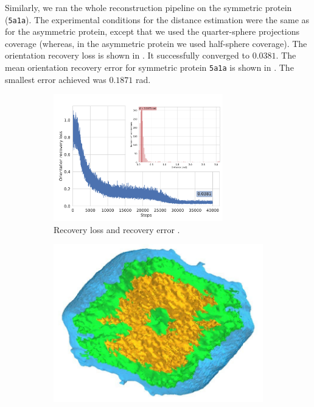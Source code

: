 Similarly, we ran the whole reconstruction pipeline on the symmetric protein (\texttt{5a1a}).
The experimental conditions for the distance estimation were the same as for the asymmetric protein, except that we used the quarter-sphere projections coverage (whereas, in the asymmetric protein we used half-sphere coverage).
The orientation recovery loss is shown in . 
It successfully converged to $0.0381$.
The mean orientation recovery error for symmetric protein \texttt{5a1a} is shown in . 
The smallest error achieved was $0.1871$ rad.

\begin{figure}[ht!]
    \centering
    \begin{subfigure}[b]{0.45\textwidth}
        \centering
        \includegraphics[height=5.5cm]{figures/5a1a_noise0_ar_aa}
        \caption{Recovery loss  and recovery error .}
    \end{subfigure}
    \hfill
    \begin{subfigure}[b]{0.25\textwidth}
        \centering
        \includegraphics[width=0.99\linewidth]{figures/5a1a_ground_truth}

\end{subfigure}
\end{figure}
